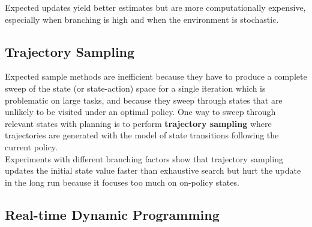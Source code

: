 \documentclass[11pt]{article}
\begin{document}
Expected updates yield better estimates but are more computationally expensive,
especially when branching is high and when the environment is stochastic.

\subsection{Trajectory Sampling}
\label{sec:org77db218}

Expected sample methods are inefficient because they have to produce a complete
sweep of the state (or state-action) space for a single iteration which is
problematic on large tasks, and because they sweep through states that are
unlikely to be visited under an optimal policy. One way to sweep through
relevant states with planning is to perform \textbf{trajectory sampling} where
trajectories are generated with the model of state transitions following the
current policy.\\
Experiments with different branching factors show that trajectory sampling
updates the initial state value faster than exhaustive search but hurt the
update in the long run because it focuses too much on on-policy states.

\subsection{Real-time Dynamic Programming}
\label{sec:org88f9c27}
\end{document}
